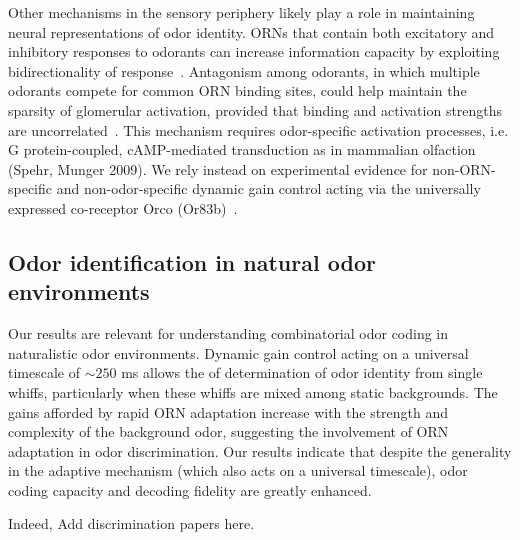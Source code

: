 \documentclass[9pt,twocolumn,twoside,lineno]{pnas-new}
\begin{document}
Other mechanisms in the sensory periphery likely play a role in maintaining neural representations of odor identity. ORNs that contain both excitatory and inhibitory responses to odorants can increase information capacity by exploiting bidirectionality of response~\cite{Cao_Tu_WL}. %
Antagonism among odorants, in which multiple odorants compete for common ORN binding sites, could help maintain the sparsity of glomerular activation, provided that binding and activation strengths are uncorrelated~\cite{reddy2017antagonism}. This mechanism requires odor-specific activation processes, i.e. G protein-coupled, cAMP-mediated transduction as in mammalian olfaction (Spehr, Munger 2009). We rely instead on experimental evidence for non-ORN-specific and non-odor-specific dynamic gain control acting via the universally expressed co-receptor Orco (Or83b)~\cite{srinivas_elife}.  %

\subsection{Odor identification in natural odor environments}

Our results are relevant for understanding combinatorial odor coding in naturalistic odor environments. Dynamic gain control acting on a universal timescale of $\sim 250$ ms allows the of determination of odor identity from single whiffs, particularly when these whiffs are mixed among static backgrounds. The gains afforded by rapid ORN adaptation increase with the strength and complexity of the background odor, suggesting the involvement of ORN adaptation in odor discrimination. %
Our results indicate that despite the generality in the adaptive mechanism (which also acts on a universal timescale), odor coding capacity and decoding fidelity are greatly enhanced. 


Indeed, {\color {blue} Add discrimination papers here}.
\end{document}
